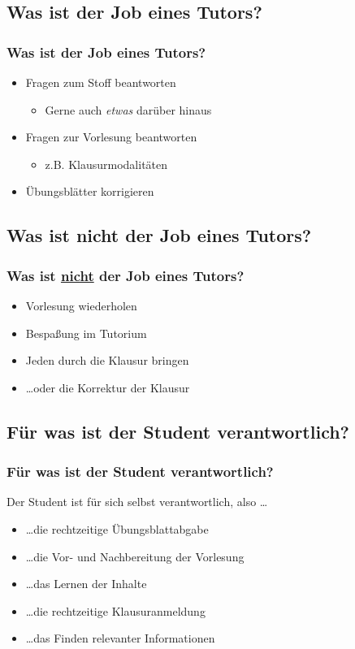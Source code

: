 \documentclass[usepdftitle=false,hyperref={pdfpagelabels=false}]{beamer}
\begin{document}
\subsection{Was ist der Job eines Tutors?}
\begin{frame}
    \frametitle{Was ist der Job eines Tutors?}
    \begin{itemize}
      \item Fragen zum Stoff beantworten
        \begin{itemize}
          \item Gerne auch \emph{etwas} darüber hinaus
        \end{itemize}
      \item Fragen zur Vorlesung beantworten
        \begin{itemize}
          \item z.B. Klausurmodalitäten
        \end{itemize}
      \item Übungsblätter korrigieren
    \end{itemize}
\end{frame}

\subsection{Was ist nicht der Job eines Tutors?}
\begin{frame}
    \frametitle{Was ist \underline{nicht} der Job eines Tutors?}
    \begin{itemize}
      \item Vorlesung wiederholen
      \item Bespaßung im Tutorium
      \item Jeden durch die Klausur bringen
      \item \dots oder die Korrektur der Klausur
    \end{itemize}
\end{frame}

\subsection{Für was ist der Student verantwortlich?}
\begin{frame}
    \frametitle{Für was ist der Student verantwortlich?}
    Der Student ist für sich selbst verantwortlich, also \dots
    \begin{itemize}
      \item \dots die rechtzeitige Übungsblattabgabe
      \item \dots die Vor- und Nachbereitung der Vorlesung
      \item \dots das Lernen der Inhalte
      \item \dots die rechtzeitige Klausuranmeldung
      \item \dots das Finden relevanter Informationen
    \end{itemize}
\end{frame}
\end{document}
